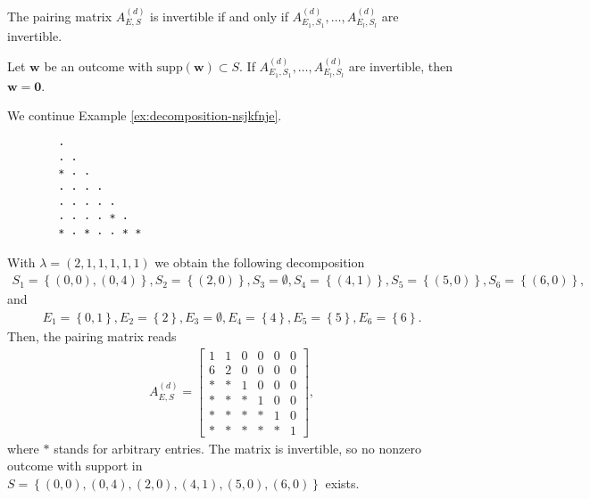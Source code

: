 \begin{corollary}
    The pairing matrix \( A^{(d)}_{E,S} \) is invertible if and only if \( A^{(d)}_{E_1,S_1}, \dots,  A^{(d)}_{E_l,S_l} \) are invertible.
\end{corollary}

\begin{corollary}
    Let \( \mathbf{w} \) be an outcome with \( \mathrm{supp}(\mathbf w) \subset S \).
    If \( A^{(d)}_{E_1,S_1}, \dots,  A^{(d)}_{E_l,S_l} \) are invertible, then \( \mathbf{w} = \mathbf 0 \).
\end{corollary}

\begin{example}
    We continue Example \ref{ex:decomposition-nsjkfnje}. 
    \begin{verbatim}
        · 
        · · 
        * · · 
        · · · · 
        · · · · · 
        · · · · * · 
        * · * · · * *
    \end{verbatim}
    With \( \lambda = (2,1,1,1,1,1) \) we obtain the following decomposition
    \begin{align*}
        S_1 = \left\{ (0,0), (0,4) \right\}, S_2 = \left\{ (2,0) \right\}, S_3 = \emptyset, S_4 = \left\{ (4,1) \right\}, S_5 = \left\{ (5,0) \right\}, S_6 = \left\{ (6,0) \right\},
    \end{align*}
    and
    \begin{align*}
        E_1 = \left\{ 0, 1 \right\}, E_2 = \left\{ 2 \right\}, E_3 = \emptyset, E_4 = \left\{ 4 \right\}, E_5 = \left\{ 5 \right\}, E_6 = \left\{ 6 \right\}.
    \end{align*}
    Then, the pairing matrix reads 
    \begin{align*}
        A^{(d)}_{E,S} = \begin{bmatrix}
            1 & 1 & 0 & 0 & 0 & 0 \\
            6 & 2 & 0 & 0 & 0 & 0 \\
            * & * & 1 & 0 & 0 & 0 \\
            * & * & * & 1 & 0 & 0 \\
            * & * & * & * & 1 & 0 \\
            * & * & * & * & * & 1
        \end{bmatrix},
    \end{align*}
    where \( * \) stands for arbitrary entries. The matrix is invertible, so no nonzero outcome with support in \( S = \left\{ (0,0), (0,4), (2,0), (4,1), (5,0), (6,0) \right\} \) exists.
\end{example}


